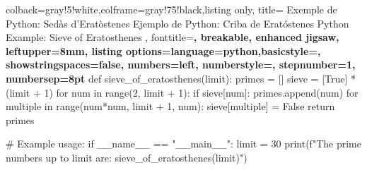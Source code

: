 \newcommand\ListTitle{\ifcase\doclanguage\or
  Exemple de Python: Sedàs d'Eratòstenes\or
  Ejemplo de Python: Criba de Eratóstenes\else
  Python Example: Sieve of Eratosthenes\fi
}
\begin{tcblisting}{colback=gray!5!white,colframe=gray!75!black,listing only,
    title=\ListTitle, fonttitle=\bfseries, breakable, enhanced jigsaw, leftupper=8mm,
    listing options={language=python,basicstyle=\ttfamily\small,
    showstringspaces=false, numbers=left, numberstyle=\footnotesize, stepnumber=1, numbersep=8pt}}
def sieve_of_eratosthenes(limit):
  primes = []
  sieve = [True] * (limit + 1)
  for num in range(2, limit + 1):
    if sieve[num]:
      primes.append(num)
      for multiple in range(num*num, limit + 1, num):
        sieve[multiple] = False
  return primes

# Example usage:
if __name__ == "__main__":
  limit = 30
  print(f"The prime numbers up to {limit} are:
          {sieve_of_eratosthenes(limit)}")
\end{tcblisting}

